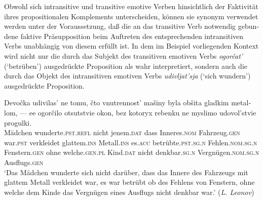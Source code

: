 \documentclass[output=paper]{langscibook}
\begin{document}
\begin{otherlanguage}{german}




Obwohl sich intransitive und transitive emotive Verben hinsichtlich der Faktivität ihres propositionalen Komplements unterscheiden, können sie synonym verwendet werden unter der Voraussetzung, daß die an das transitive Verb notwendig gebundene faktive Präsupposition beim Auftreten des entsprechenden intransitiven Verbs unabhängig von diesem erfüllt ist. In dem im Beispiel  vorliegenden Kontext wird nicht nur die durch das Subjekt des transitiven emotiven Verbs \textit{ogorčat’} (‘betrüben’) ausgedrückte Proposition als wahr interpretiert, sondern auch die durch das Objekt des intransitiven emotiven Verbs \textit{udivljat’sja} (‘sich wundern’) ausgedrückte Proposition. 

\ea \label{ex:zi83:54}
    \gll Devočka udivilas’ ne tomu, čto vnutrennost’ mašiny byla obšita gladkim metallom, — ee ogorčilo otsutstvie okon, bez kotoryx rebenku ne myslimo udovol’stvie progulki.  \\
    Mädchen wunderte.\textsc{pst}.\textsc{refl} nicht jenem.\textsc{dat} dass Inneres.\textsc{nom}  Fahrzeug.\textsc{gen} war.\textsc{pst} verkleidet glattem.\textsc{ins} Metall.\textsc{ins} {} es.\textsc{acc} betrübte.\textsc{pst}.\textsc{sg}.\textsc{n}  Fehlen.\textsc{nom}.\textsc{sg}.\textsc{n} Fenstern.\textsc{gen} ohne welche.\textsc{gen}.\textsc{pl}  Kind.\textsc{dat} nicht denkbar.\textsc{sg}.\textsc{n} Vergnügen.\textsc{nom}.\textsc{sg}.\textsc{n}  Ausflugs.\textsc{gen} \\
    \glt ‘Das Mädchen wunderte sich nicht darüber, dass das Innere des Fahrzeugs mit glattem Metall verkleidet war, es war betrübt ob des Fehlens von Fenstern, ohne welche dem Kinde das Vergnügen eines Ausflugs nicht denkbar war.’ (\textit{L. Leonov})
\z



\end{otherlanguage}
\end{document}
